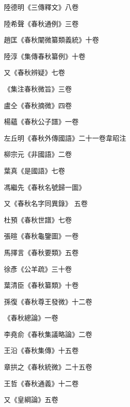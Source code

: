 \begin{pinyinscope}
 陸德明《三傳釋文》八卷



 陸希聲《春秋通例》三卷



 趙匡《春秋闡微纂類義統》十卷



 陸淳《集傳春秋纂例》十卷



 又《春秋辨疑》七卷



 《集注春秋微旨》三卷



 盧仝《春秋摘微》四卷



 楊蘊《春秋公子譜》一卷



 左丘明《春秋外傳國語》二十一卷韋昭注



 柳宗元《非國語》二卷



 葉真《是國語》七卷



 馮繼先《春秋名號歸一圖》



 又《春秋名字同異錄》
 五卷



 杜預《春秋世譜》七卷



 張暄《春秋龜鑒圖》一卷



 馬擇言《春秋要類》五卷



 徐彥《公羊疏》三十卷



 葉清臣《春秋纂類》十卷



 孫復《春秋尊王發微》十二卷



 《春秋總論》一卷



 李堯俞《春秋集議略論》二卷



 王沿《春秋集傳》十五卷



 章拱之《春秋統微》二十五卷



 王哲《春秋通義》十二卷



 又《皇綱論》五卷




\end{pinyinscope}
